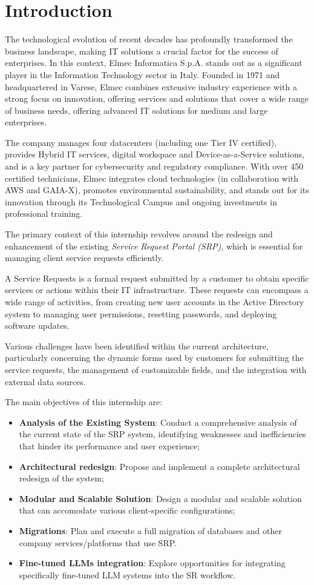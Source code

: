 \chapter{Introduction}
The technological evolution of recent decades has profoundly transformed the business landscape, making IT solutions a crucial factor for the success of enterprises. In this context, Elmec Informatica S.p.A. stands out as a significant player in the Information Technology sector in Italy. Founded in 1971 and headquartered in Varese, Elmec combines extensive industry experience with a strong focus on innovation, offering services and solutions that cover a wide range of business needs, offering advanced IT solutions for medium and large enterprises. 

The company manages four datacenters (including one Tier IV certified), provides Hybrid IT services, digital workspace and Device-as-a-Service solutions, and is a key partner for cybersecurity and regulatory compliance. With over 450 certified technicians, Elmec integrates cloud technologies (in collaboration with AWS and GAIA-X), promotes environmental sustainability, and stands out for its innovation through its Technological Campus and ongoing investments in professional training.

The primary context of this internship revolves around the redesign and enhancement of the existing \textit{Service Request Portal (SRP)}, which is essential for managing client service requests efficiently.

A Service Requests is a formal request submitted by a customer to obtain specific services or actions within their IT infrastructure. These requests can encompass a wide range of activities, from creating new user accounts in the Active Directory system to managing user permissions, resetting passwords, and deploying software updates.

Various challenges have been identified within the current architecture, particularly concerning the dynamic forms used by customers for submitting the service requests, the management of customizable fields, and the integration with external data sources.

The main objectives of this internship are:
\begin{itemize}
    \item \textbf{Analysis of the Existing System}: Conduct a comprehensive analysis of the current state of the SRP system, identifying weaknesses and inefficiencies that hinder its performance and user experience;
    \item \textbf{Architectural redesign}: Propose and implement a complete architectural redesign of the system;
    \item \textbf{Modular and Scalable Solution}: Design a modular and scalable solution that can accomodate various client-specific configurations;
    \item \textbf{Migrations}: Plan and execute a full migration of databases and other company services/platforms that use SRP.
    \item \textbf{Fine-tuned LLMs integration}: Explore opportunities for integrating specifically fine-tuned LLM systems into the SR workflow.    
\end{itemize}